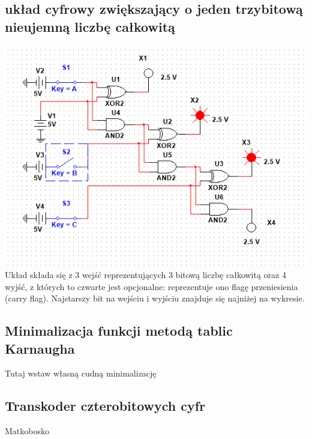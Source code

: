 \documentclass[12pt,a4paper]{article}
\begin{document}
\subsection{układ cyfrowy zwiększający o jeden trzybitową nieujemną liczbę całkowitą}
\includegraphics[width=\textwidth]{2a}
Układ składa się z 3 wejść reprezentujących 3 bitową liczbę całkowitą oraz 4 wyjść, z których to czwarte jest opcjonalne: reprezentuje ono flagę przeniesienia (carry flag). Najstarszy bit na wejściu i wyjściu znajduje się najniżej na wykresie.


\subsection{Minimalizacja funkcji metodą tablic Karnaugha}
Tutaj wstaw własną cudną minimalizację

\subsection{Transkoder czterobitowych cyfr}
Matkobosko
\end{document}
